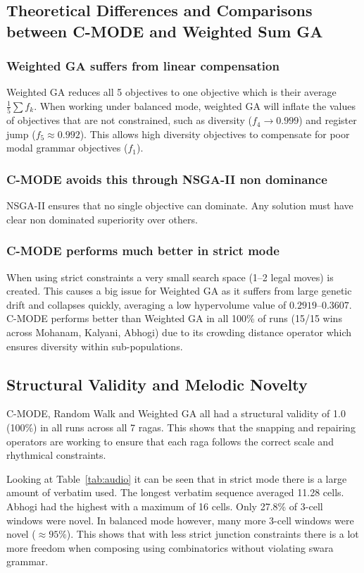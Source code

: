 \documentclass[conference,letterpaper]{IEEEtran}
\begin{document}
\subsection{Theoretical Differences and Comparisons between C-MODE and Weighted Sum GA}
\subsubsection{Weighted GA suffers from linear compensation}
Weighted GA reduces all 5 objectives to one objective which is their average $\frac{1}{5}\sum f_k$. When working under balanced mode, weighted GA will inflate the values of objectives that are not constrained, such as diversity ($f_4 \rightarrow 0.999$) and register jump ($f_5 \approx 0.992$). This allows high diversity objectives to compensate for poor modal grammar objectives ($f_1$).

\subsubsection{C-MODE avoids this through NSGA-II non dominance}
NSGA-II ensures that no single objective can dominate. Any solution must have clear non dominated superiority over others.

\subsubsection{C-MODE performs much better in strict mode}
When using strict constraints a very small search space (1--2 legal moves) is created. This causes a big issue for Weighted GA as it suffers from large genetic drift and collapses quickly, averaging a low hypervolume value of $0.2919$--$0.3607$. C-MODE performs better than Weighted GA in all 100\% of runs (15/15 wins across Mohanam, Kalyani, Abhogi) due to its crowding distance operator which ensures diversity within sub-populations.

\subsection{Structural Validity and Melodic Novelty}
C-MODE, Random Walk and Weighted GA all had a structural validity of 1.0 (100\%) in all runs across all 7 ragas. This shows that the snapping and repairing operators are working to ensure that each raga follows the correct scale and rhythmical constraints.

Looking at Table~\ref{tab:audio} it can be seen that in strict mode there is a large amount of verbatim used. The longest verbatim sequence averaged 11.28 cells. Abhogi had the highest with a maximum of 16 cells. Only 27.8\% of 3-cell windows were novel. In balanced mode however, many more 3-cell windows were novel ($\approx 95\%$). This shows that with less strict junction constraints there is a lot more freedom when composing using combinatorics without violating swara grammar.
\end{document}
